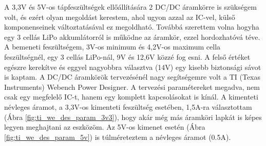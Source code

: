 \documentclass[../main.tex]{subfiles}
\begin{document}
            A 3,3V és 5V-os tápfeszültségek ellőállítására 2 DC/DC áramkörre is szükségem volt, és ezért olyan megoldást kerestem, ahol ugyon azzal az IC-vel, külső komponenseinek változtatásával ez megoldható. Továbbá szerettem volna hogyha egy 3 cellás LiPo akkumlátorról is működne az áramkör, ezzel hordozhatóvá téve. A bemeneti feszültségem, 3V-os minimum és 4,2V-os maximum cella feszültségnél, egy 3 cellás LiPo-nál, 9V és 12,6V közzé fog esni. A felső értéket egészre kerekítve és eggyel nagyobbra választva (14V) egy kisebb biztonsági sávot is kaptam.
            A DC/DC áramkörök tervezésénél nagy segítségemre volt a TI (Texas Instruments) Webench Power Designer.
            A tervezési paramétereket megadva, nem csak egy megfelelő IC-t, hanem egy komplett kapcsolásokat is kínál. A kimenteti névleges áramot, a 3,3V-os kimenteti feszültség esetében, 1,5A-ra választottam (Ábra \ref{fig:ti_we_des_param_3v3}), hogy akár még más áramköri lapkát is képes legyen meghajtani az eszközöm. Az 5V-os kimenet esetén (Ábra \ref{fig:ti_we_des_param_5v}) is túlméreteztem a névleges áramot (0.5A).
            \begin{figure}[h!] %
                \begin{floatrow}
                \end{floatrow}
            \end{figure}
            
\end{document}
